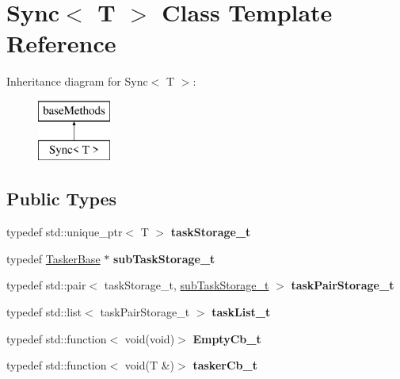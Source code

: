 \hypertarget{class_sync}{}\section{Sync$<$ T $>$ Class Template Reference}
\label{class_sync}
Inheritance diagram for Sync$<$ T $>$\+:\begin{figure}[H]
\begin{center}
\leavevmode
\includegraphics[height=2.000000cm]{class_sync}
\end{center}
\end{figure}
\subsection*{Public Types}
\begin{DoxyCompactItemize}
\item 
\mbox{\label{class_sync_a84a754a69fe29401cc17a92e90c48975}} 
typedef std\+::unique\+\_\+ptr$<$ T $>$ {\bfseries task\+Storage\+\_\+t}
\item 
\mbox{\label{class_sync_a9b62760ba34279555be314fdc09a2690}} 
typedef \hyperlink{class_tasker_base}{Tasker\+Base} $\ast$ {\bfseries sub\+Task\+Storage\+\_\+t}
\item 
\mbox{\label{class_sync_ae1688802d96c5882f89616a6fbf54fe7}} 
typedef std\+::pair$<$ task\+Storage\+\_\+t, \hyperlink{class_tasker_base}{sub\+Task\+Storage\+\_\+t} $>$ {\bfseries task\+Pair\+Storage\+\_\+t}
\item 
\mbox{\label{class_sync_a319cc5d12bb90918a33aea6aced00921}} 
typedef std\+::list$<$ task\+Pair\+Storage\+\_\+t $>$ {\bfseries task\+List\+\_\+t}
\item 
\mbox{\label{class_sync_a0d888c29e32980c1b54fcccf7a53e952}} 
typedef std\+::function$<$ void(void)$>$ {\bfseries Empty\+Cb\+\_\+t}
\item 
\mbox{\label{class_sync_a36eab6d1287f11d284de05b542afa3dc}} 
typedef std\+::function$<$ void(T \&)$>$ {\bfseries tasker\+Cb\+\_\+t}
\end{DoxyCompactItemize}
